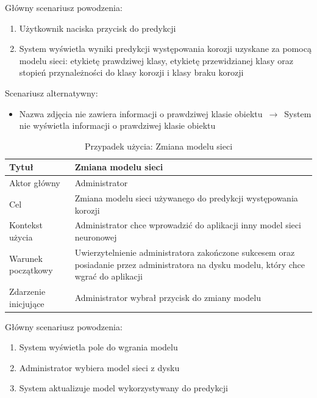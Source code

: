 \documentclass[polish,12pt]{aghthesis}
\begin{document}
\noindent
Główny scenariusz powodzenia:
\begin{enumerate}
    \item Użytkownik naciska przycisk do predykcji
    \item System wyświetla wyniki predykcji występowania korozji uzyskane za pomocą modelu sieci: etykietę prawdziwej klasy, etykietę przewidzianej klasy oraz stopień przynależności do klasy korozji i klasy braku korozji
\end{enumerate}
Scenariusz alternatywny:
\begin{itemize}
    \item Nazwa zdjęcia nie zawiera informacji o prawdziwej klasie obiektu $\,\to\,$ System nie wyświetla informacji o prawdziwej klasie obiektu
\end{itemize}

\begin{table}[h!]
\centering
 \begin{tabular}{|m{4cm}|m{11cm}|} 
 \hline
 Tytuł & Zmiana modelu sieci\\
 \hline
 Aktor główny & Administrator\\
 \hline
 Cel & Zmiana modelu sieci używanego do predykcji występowania korozji\\ 
 \hline
 Kontekst użycia & Administrator chce wprowadzić do aplikacji inny model sieci neuronowej\\ 
 \hline
 Warunek początkowy & Uwierzytelnienie administratora zakończone sukcesem oraz posiadanie przez administratora na dysku modelu, który chce wgrać do aplikacji\\
 \hline
 Zdarzenie inicjujące & Administrator wybrał przycisk do zmiany modelu\\
 \hline
\end{tabular}
\caption{Przypadek użycia: Zmiana modelu sieci}
\label{table:6}
\end{table}

\noindent
Główny scenariusz powodzenia:
\begin{enumerate}
    \item System wyświetla pole do wgrania modelu
    \item Administrator wybiera model sieci z dysku
    \item System aktualizuje model wykorzystywany do predykcji
\end{enumerate}

\newpage
\end{document}
